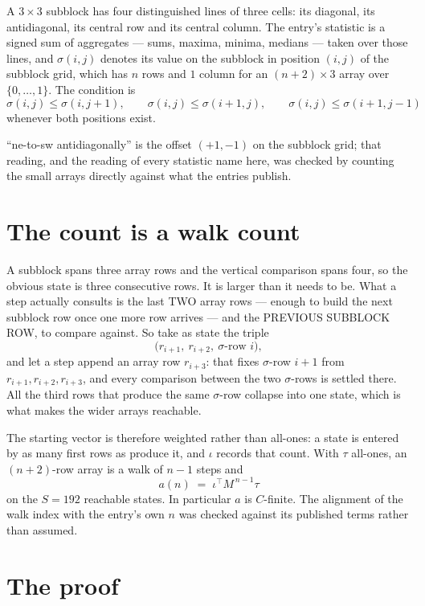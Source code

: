 \documentclass[11pt,a4paper]{article}
\theoremstyle{plain}
\theoremstyle{definition}
\begin{document}
A $3\times3$ subblock has four distinguished lines of three cells: its diagonal, its
antidiagonal, its central row and its central column. The entry's statistic is a signed sum of
aggregates --- sums, maxima, minima, medians --- taken over those lines, and $\sigma(i,j)$
denotes its value on the subblock in position $(i,j)$ of the subblock grid, which has $n$ rows
and $1$ column for an $(n+2)\times3$ array over $\{0,\dots,1\}$. The condition is
\[
\sigma(i,j)\le\sigma(i,j+1),\qquad \sigma(i,j)\le\sigma(i+1,j),\qquad \sigma(i,j)\le\sigma(i+1,j-1)
\]
whenever both positions exist.

``ne-to-sw antidiagonally'' is the offset $(+1,-1)$ on the subblock grid; that reading, and
the reading of every statistic name here, was checked by counting the small arrays directly
against what the entries publish.

\section{The count is a walk count}

A subblock spans three array rows and the vertical comparison spans four, so the obvious state
is three consecutive rows. It is larger than it needs to be. What a step actually consults is
the last TWO array rows --- enough to build the next subblock row once one more row arrives ---
and the PREVIOUS SUBBLOCK ROW, to compare against. So take as state the triple
\[
\bigl(r_{i+1},\ r_{i+2},\ \sigma\text{-row }i\bigr),
\]
and let a step append an array row $r_{i+3}$: that fixes $\sigma$-row $i+1$ from
$r_{i+1},r_{i+2},r_{i+3}$, and every comparison between the two $\sigma$-rows is settled
there. All the third rows that produce the same $\sigma$-row collapse into one state, which is
what makes the wider arrays reachable.

The starting vector is therefore weighted rather than all-ones: a state is entered by as many
first rows as produce it, and $\iota$ records that count. With $\tau$ all-ones, an
$(n+2)$-row array is a walk of $n-1$ steps and
\[
a(n)\;=\;\iota^{\!\top}M^{\,n-1}\tau
\]
on the $S=192$ reachable states. In particular $a$ is $C$-finite. The alignment of the walk
index with the entry's own $n$ was checked against its published terms rather than assumed.

\section{The proof}
\end{document}
